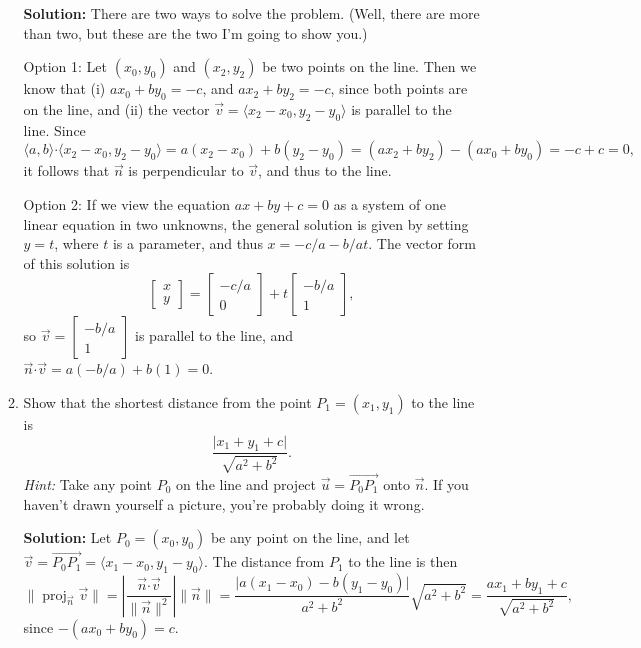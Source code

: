 \documentclass[letterpaper,12pt]{article}
\newcommand{\len}[1]{\lVert #1\rVert}
\newcommand{\abs}[1]{\lvert #1\rvert}
\newcommand{\dotp}{\boldsymbol{\cdot}}
\begin{document}
\begin{enumerate}
\begin{enumerate}
       \bigskip
       
       {\bf Solution:} There are two ways to solve the problem. (Well, there are more than two, but these are the two I'm going to show you.) 
       
       Option 1: Let $(x_0,y_0)$ and $(x_2,y_2)$ be two points on the line. Then we know that (i) $ax_0+by_0=-c$, and $ax_2+by_2=-c$, since both points are on the line, and (ii) the vector $\vec{v} = \langle x_2-x_0,y_2-y_0\rangle$ is parallel to the line. Since
       \[
       \langle a,b\rangle\dotp \langle x_2-x_0,y_2-y_0\rangle = a(x_2-x_0)+b(y_2-y_0) = (ax_2+by_2)-(ax_0+by_0) = -c + c = 0,
       \]
       it follows that $\vec{n}$ is perpendicular to $\vec{v}$, and thus to the line.
       
       Option 2: If we view the equation $ax+by+c=0$ as a system of one linear equation in two unknowns, the general solution is given by setting $y=t$, where $t$ is a parameter, and thus $x=-c/a-b/at$. The vector form of this solution is
       \[
       \begin{bmatrix}x\\y\end{bmatrix} = \begin{bmatrix}-c/a\\0\end{bmatrix}+t\begin{bmatrix}-b/a\\1\end{bmatrix},
       \]
       so $\vec{v} = \begin{bmatrix}-b/a\\1\end{bmatrix}$ is parallel to the line, and $\vec{n}\dotp\vec{v} = a(-b/a)+b(1) = 0$.
       
       \bigskip
       
       \item Show that the shortest distance from the point $P_1=(x_1,y_1)$ to the line is
\[
 \frac{\abs{x_1+y_1+c}}{\sqrt{a^2+b^2}}.
\]
{\em Hint: } Take any point $P_0$ on the line and project $\vec{u}=\overrightarrow{P_0P_1}$ onto $\vec{n}$. If you haven't drawn yourself a picture, you're probably doing it wrong.

\bigskip

{\bf Solution:} Let $P_0=(x_0,y_0)$ be any point on the line, and let $\vec{v} = \overrightarrow{P_0P_1} = \langle x_1-x_0,y_1-y_0\rangle$. The distance from $P_1$ to the line is then
\[
\len{\operatorname{proj}_{\vec{n}}\vec{v}} = \left|\frac{\vec{n}\dotp\vec{v}}{\len{\vec{n}}^2}\right|\len{\vec{n}} = \frac{\abs{a(x_1-x_0)-b(y_1-y_0)}}{a^2+b^2}\sqrt{a^2+b^2} = \frac{ax_1+by_1+c}{\sqrt{a^2+b^2}},
\]
since $-(ax_0+by_0)=c$.


\end{enumerate}
\end{enumerate}
\end{document}
